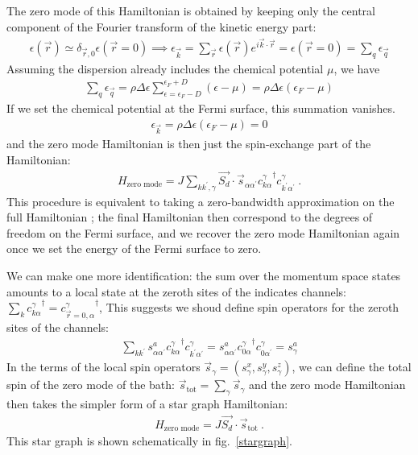 \documentclass[12pt]{revtex4-2}
\begin{document}
The zero mode of this Hamiltonian is obtained by keeping only the central component of the Fourier transform of the kinetic energy part:
\begin{align}
	\epsilon(\vec r) \simeq \delta_{\vec r,0}\epsilon(\vec r = 0) \implies \epsilon_{\vec k} = \sum_{\vec r}\epsilon(\vec r) e^{i \vec{k}\cdot\vec{r}} = \epsilon(\vec r=0) = \sum_q \epsilon_{\vec q}
\end{align}
Assuming the dispersion already includes the chemical potential \(\mu\), we have 
\begin{align}
\sum_q \epsilon_{\vec q} = \rho \Delta \epsilon\sum_{\epsilon=\epsilon_F-D}^{\epsilon_F + D} \left(\epsilon - \mu\right) = \rho\Delta \epsilon\left(\epsilon_F - \mu\right)
\end{align}
If we set the chemical potential at the Fermi surface, this summation vanishes.
\begin{align}
	\epsilon_{\vec k} =  \rho\Delta \epsilon\left(\epsilon_F - \mu\right) = 0
\end{align}
and the zero mode Hamiltonian is then just the spin-exchange part of the Hamiltonian:
\begin{align}
	H_\text{zero mode} = J\sum_{kk^\prime,\gamma} \vec{S_d}\cdot\vec{s}_{\alpha\alpha^\prime}{c^\gamma_{k\alpha}}^\dagger c^\gamma_{k^\prime\alpha^\prime}~.
\end{align}
This procedure is equivalent to taking a zero-bandwidth approximation on the full Hamiltonian \cite{zitko_fabrizio_2017}; the final Hamiltonian then correspond to the degrees of freedom on the Fermi surface, and we recover the zero mode Hamiltonian again once we set the energy of the Fermi surface to zero.

We can make one more identification: the sum over the momentum space states amounts to a local state at the zeroth sites of the indicates channels: \(\sum_k {c^\gamma_{k\alpha}}^\dagger = {c^\gamma_{\vec r=0, \alpha}}^\dagger\), This suggests we shoud define spin operators for the zeroth sites of the channels:
\begin{align}
	\sum_{kk^\prime} {s}^a_{\alpha\alpha^\prime}{c^\gamma_{k\alpha}}^\dagger c^\gamma_{k^\prime\alpha^\prime} = {s}^a_{\alpha\alpha^\prime}{c^\gamma_{0\alpha}}^\dagger c^\gamma_{0\alpha^\prime} = s_\gamma^a
\end{align}
In the terms of the local spin operators \(\vec s_\gamma = (s_\gamma^x,s_\gamma^y,s_\gamma^z)\), we can define the total spin of the zero mode of the bath: \(\vec s_\text{tot} = \sum_\gamma \vec s_\gamma\) and the zero mode Hamiltonian then takes the simpler form of a star graph Hamiltonian:
\begin{align}
	\label{zeromode_ham}
	H_\text{zero mode} = J \vec{S_d}\cdot\vec{s}_\text{tot}~.
\end{align}
This star graph is shown schematically in fig.~\ref{stargraph}.
\end{document}
